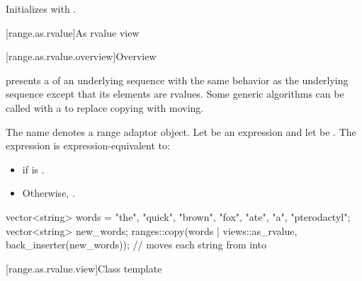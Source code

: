 \begin{itemdescr}
\pnum
\effects
Initializes  with .
\end{itemdescr}

[range.as.rvalue]{As rvalue view}

[range.as.rvalue.overview]{Overview}

\pnum
{} presents a  of an underlying sequence
with the same behavior as the underlying sequence
except that its elements are rvalues.
Some generic algorithms can be called with a 
to replace copying with moving.

\pnum
{}%
The name  denotes
a range adaptor object.
Let  be an expression and let  be .
The expression  is expression-equivalent to:
\begin{itemize}
\item
{} if  is .
\item
Otherwise, .
\end{itemize}

\pnum
\begin{example}
\begin{codeblock}
vector<string> words = {"the", "quick", "brown", "fox", "ate", "a", "pterodactyl"};
vector<string> new_words;
ranges::copy(words | views::as_rvalue, back_inserter(new_words));
  // moves each string from  into 
\end{codeblock}
\end{example}

[range.as.rvalue.view]{Class template }

